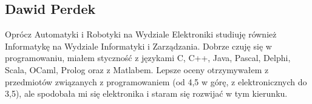 \subsection{Dawid Perdek}
Oprócz Automatyki i Robotyki na Wydziale Elektroniki studiuję również Informatykę na Wydziale Informatyki i Zarządzania. Dobrze czuję się w programowaniu, miałem styczność z językami C, C++, Java, Pascal, Delphi, Scala, OCaml, Prolog oraz z Matlabem. Lepsze oceny otrzymywałem z przedmiotów związanych z programowaniem (od 4,5 w górę, z elektronicznych do 3,5), ale spodobała mi się elektronika i staram się rozwijać w tym kierunku.
